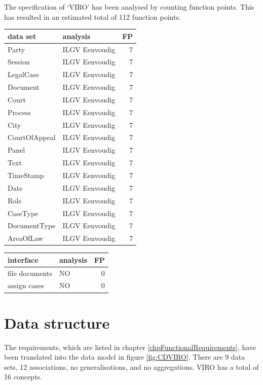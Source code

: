 \documentclass[10pt,a4paper]{report}              %
\theoremstyle{plain}\theorembodyfont{\rmfamily}\newtheorem{definition}{Definition}[section]
\theoremstyle{plain}\theorembodyfont{\rmfamily}\newtheorem{designrule}[definition]{Requirement}
\begin{document}
The specification of `VIRO' has been analysed by counting function points\cite{IFPUG}. This has resulted in an estimated total of 112 function points.

\begin{center}
\begin{tabular}{llr}
data set & analysis & FP\\
\hline
Party & ILGV Eenvoudig & 7\\
Session & ILGV Eenvoudig & 7\\
LegalCase & ILGV Eenvoudig & 7\\
Document & ILGV Eenvoudig & 7\\
Court & ILGV Eenvoudig & 7\\
Process & ILGV Eenvoudig & 7\\
City & ILGV Eenvoudig & 7\\
CourtOfAppeal & ILGV Eenvoudig & 7\\
Panel & ILGV Eenvoudig & 7\\
Text & ILGV Eenvoudig & 7\\
TimeStamp & ILGV Eenvoudig & 7\\
Date & ILGV Eenvoudig & 7\\
Role & ILGV Eenvoudig & 7\\
CaseType & ILGV Eenvoudig & 7\\
DocumentType & ILGV Eenvoudig & 7\\
AreaOfLaw & ILGV Eenvoudig & 7\\
\end{tabular}
\end{center}

\begin{center}
\begin{tabular}{llr}
interface & analysis & FP\\
\hline
file documents & NO & 0\\
assign cases & NO & 0\\
\end{tabular}
\end{center}

\chapter{Data structure}\label{chpDataAnalysis}

The requirements, which are listed in chapter \ref{chpFunctionalRequirements}, have been translated into the data model in figure \ref{fig:CDVIRO}. There are 9 data sets, 12 associations, no generalisations, and no aggregations. VIRO has a total of 16 concepts.
\end{document}

